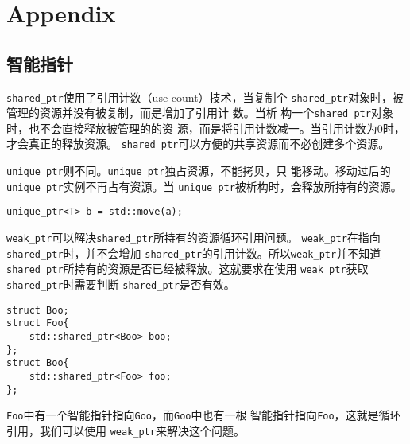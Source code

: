 \clearpage
\section{Appendix}

\subsection{智能指针}
\label{sec:SmartPointer}
\texttt{shared\_ptr}使用了引用计数（use count）技术，当复制个
\texttt{shared\_ptr}对象时，被管理的资源并没有被复制，而是增加了引用计
数。当析 构一个\texttt{shared\_ptr}对象时，也不会直接释放被管理的的资
源，而是将引用计数减一。当引用计数为0时，才会真正的释放资源。
\texttt{shared\_ptr}可以方便的共享资源而不必创建多个资源。

\texttt{unique\_ptr}则不同。\texttt{unique\_ptr}独占资源，不能拷贝，只
能移动。移动过后的\texttt{unique\_ptr}实例不再占有资源。当
\texttt{unique\_ptr}被析构时，会释放所持有的资源。
\begin{verbatim}
unique_ptr<T> b = std::move(a);
\end{verbatim}
\texttt{weak\_ptr}可以解决\texttt{shared\_ptr}所持有的资源循环引用问题。
\texttt{weak\_ptr}在指向\texttt{shared\_ptr}时，并不会增加
\texttt{shared\_ptr}的引用计数。所以\texttt{weak\_ptr}并不知道
\texttt{shared\_ptr}所持有的资源是否已经被释放。这就要求在使用
\texttt{weak\_ptr}获取\texttt{shared\_ptr}时需要判断
\texttt{shared\_ptr}是否有效。

\begin{verbatim}
struct Boo;
struct Foo{
    std::shared_ptr<Boo> boo;
};
struct Boo{
    std::shared_ptr<Foo> foo;
};
\end{verbatim}

\texttt{Foo}中有一个智能指针指向\texttt{Goo}，而\texttt{Goo}中也有一根
智能指针指向\texttt{Foo}，这就是循环引用，我们可以使用
\texttt{weak\_ptr}来解决这个问题。

